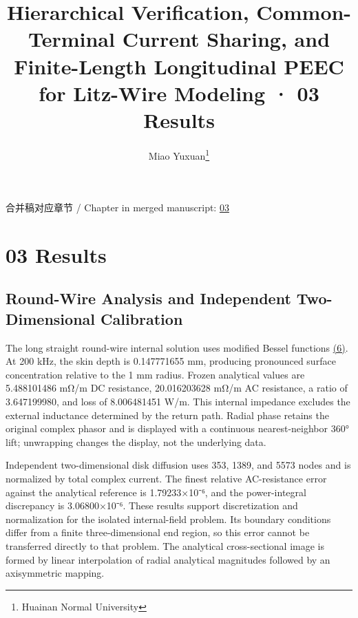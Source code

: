 \documentclass[journal,10pt]{IEEEtran}
\begin{document}
\title{Hierarchical Verification, Common-Terminal Current Sharing, and Finite-Length Longitudinal PEEC for Litz-Wire Modeling · 03 Results}
\author{Miao Yuxuan\thanks{Huainan Normal University}}

\maketitle
\noindent 合并稿对应章节 / Chapter in merged manuscript: \href{paper_en_ieee.pdf#chapter-03}{03}\par
\FloatBarrier
\section*{03 Results}
\hypertarget{chapter-03}{}
\subsection*{Round-Wire Analysis and Independent Two-Dimensional Calibration}
\hypertarget{03.analytic.heading}{}
The long straight round-wire internal solution uses modified Bessel functions \href{paper_en_ieee.pdf#E03}{(6)}. At 200 kHz, the skin depth is 0.147771655 mm, producing pronounced surface concentration relative to the 1 mm radius. Frozen analytical values are 5.488101486 mΩ/m DC resistance, 20.016203628 mΩ/m AC resistance, a ratio of 3.647199980, and loss of 8.006481451 W/m. This internal impedance excludes the external inductance determined by the return path. Radial phase retains the original complex phasor and is displayed with a continuous nearest-neighbor 360° lift; unwrapping changes the display, not the underlying data.


Independent two-dimensional disk diffusion uses 353, 1389, and 5573 nodes and is normalized by total complex current. The finest relative AC-resistance error against the analytical reference is 1.79233×10⁻⁶, and the power-integral discrepancy is 3.06800×10⁻⁶. These results support discretization and normalization for the isolated internal-field problem. Its boundary conditions differ from a finite three-dimensional end region, so this error cannot be transferred directly to that problem. The analytical cross-sectional image is formed by linear interpolation of radial analytical magnitudes followed by an axisymmetric mapping.
\end{document}
